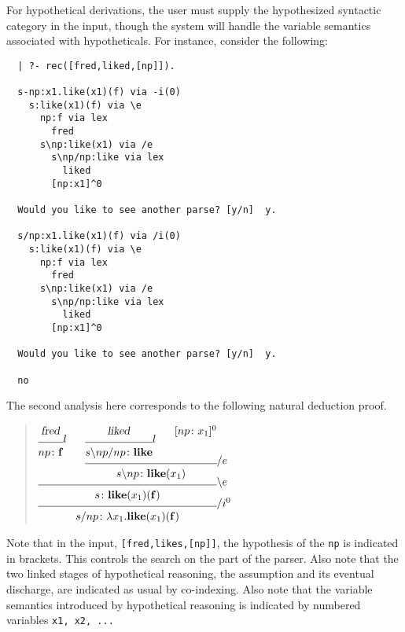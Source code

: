For hypothetical derivations, the user must supply the hypothesized
syntactic category in the input, though the system will handle the
variable semantics associated with hypotheticals.  For instance,
consider the following:
%
\begin{verbatim}
  | ?- rec([fred,liked,[np]]).
  
  s-np:x1.like(x1)(f) via -i(0)
    s:like(x1)(f) via \e
      np:f via lex
        fred
      s\np:like(x1) via /e
        s\np/np:like via lex
          liked
        [np:x1]^0
  
  Would you like to see another parse? [y/n]  y.
  
  s/np:x1.like(x1)(f) via /i(0)
    s:like(x1)(f) via \e
      np:f via lex
        fred
      s\np:like(x1) via /e
        s\np/np:like via lex
          liked
        [np:x1]^0
  
  Would you like to see another parse? [y/n]  y.
  
  no
\end{verbatim}
%
The second analysis here corresponds to the following natural
deduction proof.
%
\begin{quote}
\small
$
\infr{\infr{\infr{\men{fred}}
                 {\synsem{np}
                         {\con{f}}}
                 {\lexr}
            \qquad
            \infr{\infr{\men{liked}}
                       {\synsem{\fd{\bk{s}
                                       {np}}
                                   {np}}
                               {\con{like}}}
                       {\lexr}
                  \qquad
                  [\synsem{np}
                          {x_1}]^0}
                 {\synsem{\bk{s}
                             {np}}
                         {\con{like}
                          (x_1)}}
                 {\fel}}
           {\synsem{s}
                   {\con{like}
                    (x_1)
                    (\con{f})}}
           {\bel}}
     {\synsem{\fd{s}
                 {np}}
             {\lam{x_1}
                  {\con{like}
                   (x_1)
                   (\con{f})}}}
     {\fin{0}}
$
\end{quote}
%
Note that in the input, {\tt [fred,likes,[np]]}, the hypothesis of the
{\tt np} is indicated in brackets.  This controls the search on the
part of the parser.  Also note that the two linked stages of
hypothetical reasoning, the assumption and its eventual discharge, are
indicated as usual by co-indexing.  Also note that the variable
semantics introduced by hypothetical reasoning is indicated by
numbered variables {\tt x1, x2, ...}



